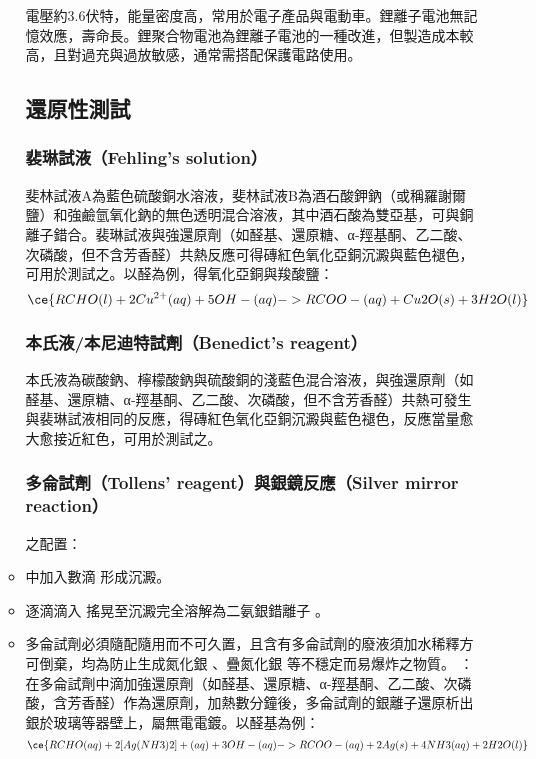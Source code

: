 \documentclass[a4paper,12pt]{report}
\begin{document}
\begin{itemize}
\begin{itemize}
電壓約3.6伏特，能量密度高，常用於電子產品與電動車。鋰離子電池無記憶效應，壽命長。鋰聚合物電池為鋰離子電池的一種改進，但製造成本較高，且對過充與過放敏感，通常需搭配保護電路使用。
\subsection{還原性測試}
\subsubsection{裴琳試液（Fehling's solution）}
斐林試液A為藍色硫酸銅水溶液，斐林試液B為酒石酸鉀鈉（或稱羅謝爾鹽）和強鹼氫氧化鈉的無色透明混合溶液，其中酒石酸為雙亞基，可與銅離子錯合。裴琳試液與強還原劑（如醛基、還原糖、α-羥基酮、乙二酸、次磷酸，但不含芳香醛）共熱反應可得磚紅色氧化亞銅沉澱與藍色褪色，可用於測試之。以醛為例，得氧化亞銅與羧酸鹽：
\[\ce{RCHO(l) + 2Cu^{2+}(aq) + 5OH-(aq) -> RCOO-(aq) + Cu2O(s) + 3H2O(l)}\]
\subsubsection{本氏液/本尼迪特試劑（Benedict's reagent）}
本氏液為碳酸鈉、檸檬酸鈉與硫酸銅的淺藍色混合溶液，與強還原劑（如醛基、還原糖、α-羥基酮、乙二酸、次磷酸，但不含芳香醛）共熱可發生與裴琳試液相同的反應，得磚紅色氧化亞銅沉澱與藍色褪色，反應當量愈大愈接近紅色，可用於測試之。
\subsubsection{多侖試劑（Tollens' reagent）與銀鏡反應（Silver mirror reaction）}
之配置：
\ben
\item {} 中加入數滴  形成沉澱。
\item 逐滴滴入  搖晃至沉澱完全溶解為二氨銀錯離子 \ce{[Ag(NH3)2]+}。
\item 多侖試劑必須隨配隨用而不可久置，且含有多侖試劑的廢液須加水稀釋方可倒棄，均為防止生成氮化銀  、疊氮化銀  等不穩定而易爆炸之物質。
\een
{}：在多侖試劑中滴加強還原劑（如醛基、還原糖、α-羥基酮、乙二酸、次磷酸，含芳香醛）作為還原劑，加熱數分鐘後，多侖試劑的銀離子還原析出銀於玻璃等器壁上，屬無電電鍍。以醛基為例：
\[\ce{RCHO(aq) + 2[Ag(NH3)2]+(aq) + 3OH-(aq) -> RCOO-(aq) + 2Ag(s) + 4NH3(aq) + 2H2O(l)}\]

\end{itemize}
\end{itemize}
\end{document}

